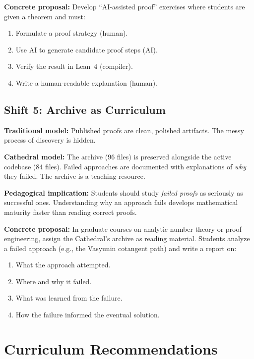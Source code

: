 \documentclass[11pt,a4paper]{article}
\begin{document}
\textbf{Concrete proposal:} Develop ``AI-assisted proof'' exercises
where students are given a theorem and must:
\begin{enumerate}
  \item Formulate a proof strategy (human).
  \item Use AI to generate candidate proof steps (AI).
  \item Verify the result in Lean~4 (compiler).
  \item Write a human-readable explanation (human).
\end{enumerate}

\subsection{Shift 5: Archive as Curriculum}

\textbf{Traditional model:} Published proofs are clean, polished
artifacts. The messy process of discovery is hidden.

\textbf{Cathedral model:} The archive (96 files) is preserved
alongside the active codebase (84 files). Failed approaches are
documented with explanations of \emph{why} they failed. The
archive is a teaching resource.

\textbf{Pedagogical implication:} Students should study
\emph{failed proofs} as seriously as successful ones. Understanding
why an approach fails develops mathematical maturity faster than
reading correct proofs.

\textbf{Concrete proposal:} In graduate courses on analytic number
theory or proof engineering, assign the Cathedral's archive as
reading material. Students analyze a failed approach (e.g., the
Vasyunin cotangent path) and write a report on:
\begin{enumerate}
  \item What the approach attempted.
  \item Where and why it failed.
  \item What was learned from the failure.
  \item How the failure informed the eventual solution.
\end{enumerate}

\section{Curriculum Recommendations}
\end{document}
